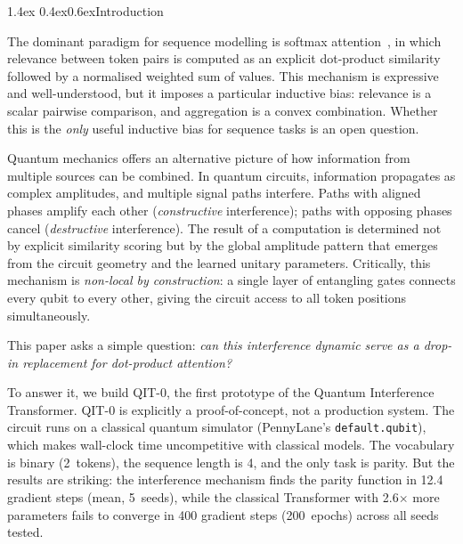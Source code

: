\documentclass[11pt,a4paper]{article}
\makeatletter
\renewcommand\section{\@startsection{section}{1}{\z@}%
  {1.4ex \@plus 0.4ex}{0.6ex}{\normalfont\large\bfseries}}
\makeatother
\begin{document}
\tableofcontents
\newpage

\section{Introduction}
\label{sec:intro}

The dominant paradigm for sequence modelling is softmax attention~\cite{vaswani2017attention},
in which relevance between token pairs is computed as an explicit dot-product similarity
followed by a normalised weighted sum of values. This mechanism is expressive and
well-understood, but it imposes a particular inductive bias: relevance is a scalar
pairwise comparison, and aggregation is a convex combination. Whether this is the
\emph{only} useful inductive bias for sequence tasks is an open question.

Quantum mechanics offers an alternative picture of how information from multiple sources
can be combined. In quantum circuits, information propagates as complex amplitudes, and
multiple signal paths interfere. Paths with aligned phases amplify each other
(\emph{constructive} interference); paths with opposing phases cancel
(\emph{destructive} interference). The result of a computation is determined not by
explicit similarity scoring but by the global amplitude pattern that emerges from the
circuit geometry and the learned unitary parameters. Critically, this mechanism is
\emph{non-local by construction}: a single layer of entangling gates connects every
qubit to every other, giving the circuit access to all token positions simultaneously.

This paper asks a simple question: \emph{can this interference dynamic serve as a
drop-in replacement for dot-product attention?}

To answer it, we build QIT-0, the first prototype of the Quantum Interference
Transformer. QIT-0 is explicitly a proof-of-concept, not a production system. The
circuit runs on a classical quantum simulator (PennyLane's \texttt{default.qubit}),
which makes wall-clock time uncompetitive with classical models. The vocabulary is binary
(2~tokens), the sequence length is 4, and the only task is parity. But the results are
striking: the interference mechanism finds the parity function in 12.4 gradient steps (mean, 5~seeds),
while the classical Transformer with 2.6$\times$ more parameters fails to converge
in 400 gradient steps (200~epochs) across all seeds tested.
\end{document}
